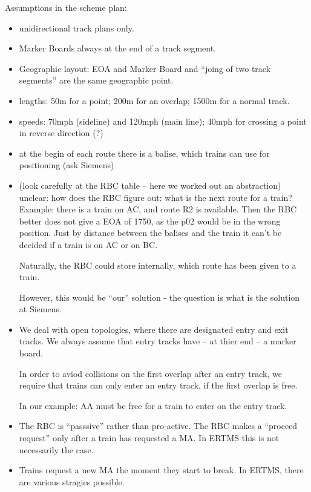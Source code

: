 Assumptions in the scheme plan:
\begin{itemize}
\item unidirectional track plans only.
\item Marker Boards always at the end of a track segment.
\item 
Geographic layout: EOA and Marker Board and ``joing of two track
segments'' are the same geographic point.
\item lengths:
50m for a point;
200m for an overlap;
1500m for a normal track.
\item
 speeds: 70mph (sideline) and 120mph (main line); 40mph for crossing a point in reverse direction (?)

\item 
at the begin of each route there is a balise, which trains can use for positioning (ask Siemens)

\item (look carefully at the RBC table -- here we worked out an abstraction)
unclear: how does the RBC figure out: what is the next route for a
train?  Example: there is a train on AC, and route R2 is
available. Then the RBC better does not give a EOA of 1750, as the p02
would be in the wrong position. Just by distance between the balises
and the train it can't be decided if a train is on AC or on BC. 

Naturally, the RBC could store internally, which route has been given to a train. 

However, this would be ``our'' solution - the question is what is the solution at Siemens.


\item
We deal with open topologies, where there are designated entry and
exit tracks. We always assume that entry tracks have -- at thier end
-- a marker board.

In order to aviod collisions on the first overlap after
an entry track, we require that trains can only enter an entry track,
if the first overlap is free.

In our example: AA must be free for a train to enter on the entry track.

\item 
The RBC is ``passsive'' rather than pro-active. The RBC makes a ``proceed request'' only after a train has requested a MA. In ERTMS this is not necessarily the case.

\item
Trains request a new MA the moment they start to break. In ERTMS, there are various stragies possible.

\end{itemize}

